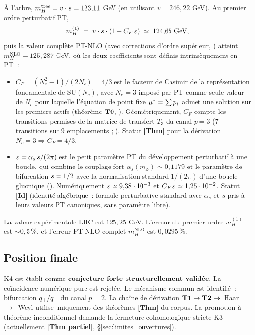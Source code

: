À l'arbre, $m_H^{\mathrm{tree}} = v \cdot s = 123{,}11$ GeV (en
utilisant $v = 246{,}22$ GeV). Au premier ordre perturbatif PT,
\begin{equation}
m_H^{(1)} \;=\; v \cdot s \cdot (1 + C_F\,\varepsilon) \;\simeq\; 124{,}65 \text{ GeV},
\label{eq:mH_1}
\end{equation}
puis la valeur complète PT-NLO (avec corrections d'ordre supérieur,
\cite{PT_M5}) atteint $m_H^{\mathrm{NLO}} = 125{,}287$ GeV,
où les deux coefficients sont définis intrinsèquement en PT~:
\begin{itemize}[nosep,leftmargin=*]
\item $C_F = (N_c^{2} - 1)/(2 N_c) = 4/3$ est le facteur de Casimir de la
représentation fondamentale de $\mathrm{SU}(N_c)$, avec $N_c = 3$ imposé
par PT comme seule valeur de $N_c$ pour laquelle l'équation de point
fixe $\mu^{*} = \sum p_i$ admet une solution sur les premiers actifs
(théorème $\textbf{T0}$, \cite{PT_M3}). Géométriquement, $C_F$
compte les transitions permises de la matrice de transfert $T_3$ du
canal $p = 3$ (7 transitions sur 9 emplacements ;
\cite{PT_M5}). Statut \textbf{[Thm]} pour la
dérivation $N_c = 3 \Rightarrow C_F = 4/3$.
\item $\varepsilon = \alpha_s\,s / (2\pi)$ est le petit paramètre PT du
développement perturbatif à une boucle, qui combine le couplage fort
$\alpha_s(m_Z) \simeq 0{,}1179$ et le paramètre de bifurcation
$s = 1/2$ avec la normalisation standard $1/(2\pi)$ d'une boucle
gluonique (\cite{PT_M5}).
Numériquement $\varepsilon \simeq 9{,}38 \cdot 10^{-3}$ et
$C_F\,\varepsilon \simeq 1{,}25 \cdot 10^{-2}$. Statut \textbf{[Id]} (identité
algébrique~: formule perturbative standard avec $\alpha_s$ et $s$ pris
à leurs valeurs PT canoniques, sans paramètre libre).
\end{itemize}

La valeur expérimentale LHC est $125{,}25$ GeV. L'erreur du premier ordre
$m_H^{(1)}$ est $\sim 0{,}5\,\%$, et l'erreur PT-NLO complet
$m_H^{\mathrm{NLO}}$ est $0{,}0295\,\%$.

\subsection{Position finale}
\label{sec:K4_position}

K4 est établi comme \textbf{conjecture forte structurellement validée}.
La coïncidence numérique pure est rejetée. Le mécanisme commun est
identifié~: bifurcation $q_{+}/q_{-}$ du canal $p = 2$. La chaîne de
dérivation $\textbf{T1} \to \textbf{T2} \to$~Haar~$\to$~Weyl utilise uniquement des
théorèmes \textbf{[Thm]} du corpus. La promotion à théorème
inconditionnel demande la fermeture cohomologique stricte K3
(actuellement \textbf{[Thm partiel]}, \S\ref{sec:limites_ouvertures}).

